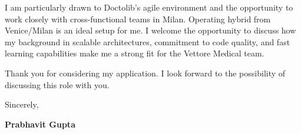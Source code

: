 \documentclass[11pt,a4paper]{article}
\begin{document}
I am particularly drawn to Doctolib's agile environment and the opportunity to work closely with cross-functional teams in Milan. Operating hybrid from Venice/Milan is an ideal setup for me. I welcome the opportunity to discuss how my background in scalable architectures, commitment to code quality, and fast learning capabilities make me a strong fit for the Vettore Medical team.

Thank you for considering my application. I look forward to the possibility of discussing this role with you.

\vspace{1em}
Sincerely,

\textbf{Prabhavit Gupta}
\end{document}
